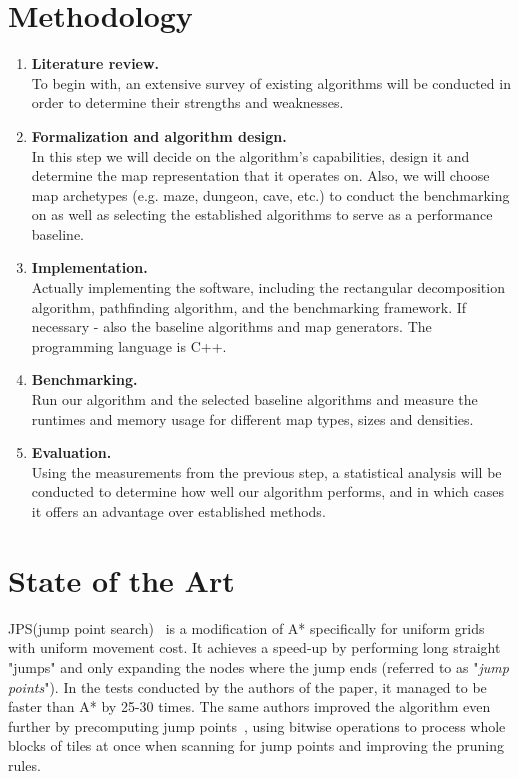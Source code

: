 \documentclass{article}
\begin{document}
\section{Methodology}
\begin{enumerate}
	\item \textbf{Literature review.} \\
	To begin with, an extensive survey of existing algorithms will be conducted in order to determine their strengths and weaknesses.
	\item \textbf{Formalization and algorithm design.} \\
	In this step we will decide on the algorithm's capabilities, design it and determine the map representation that it operates on. Also, we will choose map archetypes (e.g. maze, dungeon, cave, etc.) to conduct the benchmarking on as well as selecting the established algorithms to serve as a performance baseline.
	\item \textbf{Implementation.} \\
	Actually implementing the software, including the rectangular decomposition algorithm, pathfinding algorithm, and the benchmarking framework. If necessary - also the baseline algorithms and map generators. The programming language is C++.
	\item \textbf{Benchmarking.} \\
	Run our algorithm and the selected baseline algorithms and measure the runtimes and memory usage for different map types, sizes and densities.
	\item \textbf{Evaluation.} \\
	Using the measurements from the previous step, a statistical analysis will be conducted to determine how well our algorithm performs, and in which cases it offers an advantage over established methods.
\end{enumerate}

\section{State of the Art}

JPS(jump point search)~\cite{harabor2011online} is a modification of A* specifically for uniform grids with uniform movement cost. It achieves a speed-up by performing long straight "jumps" and only expanding the nodes where the jump ends (referred to as "\emph{jump points}"). In the tests conducted by the authors of the paper, it managed to be faster than A* by 25-30 times. The same authors improved the algorithm even further by precomputing jump points~\cite{harabor2014improving}, using bitwise operations to process whole blocks of tiles at once when scanning for jump points and improving the pruning rules.\\
\end{document}
